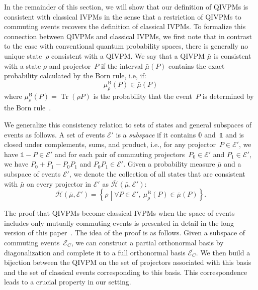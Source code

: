 \documentclass[english,reprint, aps, prl,superscriptaddress, showpacs,
showkeys, longbibliography, amsmath, amssymb, floatfix]{revtex4-1}
\theoremstyle{plain}
\theoremstyle{definition}
\newcommand{\Hilb}{\mathcal{H}}
\newcommand{\events}{\ensuremath{\mathcal{E}}}
\newcommand{\set}[2]{\ensuremath{\left\{ {#1}\mathrel{}\middle|\mathrel{}{#2}\right\} }}
\newcommand{\Tr}{\ensuremath{\mathop{\mathrm{Tr}}\nolimits}}
\newcommand{\coreBorn}{\ensuremath{\overline{\Hilb}}}
\begin{document}
In the remainder of this section, we will show that our definition of
QIVPMs is consistent with classical IVPMs in the sense that a
restriction of QIVPMs to commuting events recovers the definition of
classical IVPMs. To formalize this connection between QIVPMs and
classical IVPMs, we first note that in contrast to the case with
conventional quantum probability spaces, there is generally no unique
state~$\rho$ consistent with a QIVPM. We say that a QIVPM $\bar{\mu}$
is consistent with a state $\rho$ and projector~$P$ if the interval
$\bar{\mu}(P)$ contains the exact probability calculated by the Born
rule, i.e, if:
\begin{equation}
\mu_{\rho}^{\mathrm{B}}\left(P\right)\in\bar{\mu}\left(P\right)
\end{equation}
where $\mu_{\rho}^{\mathrm{B}}\left(P\right)=\Tr\left(\rho P\right)$
is the probability that the event~$P$ is determined by the Born
rule~\citep{Born1983,peres1995quantum,544199}.

We generalize this consistency relation to sets of states and general
subspaces of events as follows. A set of events $\events'$ is a
\emph{subspace} if it contains $\mathbb{0}$ and~$\mathbb{1}$ and is
closed under complements, sums, and product, i.e., for any projector~$P\in\events'$,
we have $\mathbb{1}-P\in\events'$ and for each pair of commuting
projectors~$P_{0}\in\events'$ and $P_{1}\in\events'$, we have $P_{0}+P_{1}-P_{0}P_{1}$
and $P_{0}P_{1}\in\events'$. Given a
probability measure $\bar{\mu}$ and a subspace of events $\events'$,
we denote the collection of all states that are consistent with
$\bar{\mu}$ on every projector in $\events'$ as
$\coreBorn(\bar{\mu},\events')$:
\begin{equation}
\label{eq:hbar}
\coreBorn\left(\bar{\mu},\events'\right)=\set{\rho}{\forall P\in \events',~\mu_{\rho}^{\mathrm{B}}\left(P\right)\in\bar{\mu}\left(P\right)}.
\end{equation}

The proof that QIVPMs become classical IVPMs when the space of events
includes only mutually commuting events is presented in detail in the
long version of this paper~\cite{HOSTunpublished}. The idea of the
proof is as follows. Given a subspace of commuting events~$\events_C$,
we can construct a partial orthonormal basis by diagonalization and
complete it to a full orthonormal basis $\overline{\events_C}$. We
then build a bijection between the QIVPM on the set of projectors
associated with this basis and the set of classical events
corresponding to this basis. This correspondence leads to a crucial
property in our setting.
\end{document}
